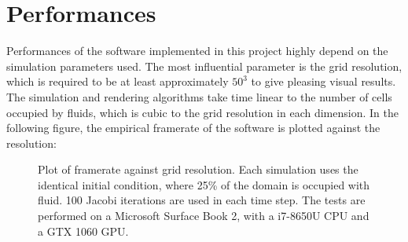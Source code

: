 \section{Performances}

Performances of the software implemented in this project highly depend on the simulation parameters used. The most influential parameter is the grid resolution, which is required to be at least approximately $50^3$ to give pleasing visual results. The simulation and rendering algorithms take time linear to the number of cells occupied by fluids, which is cubic to the grid resolution in each dimension. In the following figure, the empirical framerate of the software is plotted against the resolution:

\begin{figure}[H]
    \centering

    
    \caption{Plot of framerate against grid resolution. Each simulation uses the identical initial condition, where 25\% of the domain is occupied with fluid. 100 Jacobi iterations are used in each time step. The tests are performed on a Microsoft Surface Book 2, with a i7-8650U CPU and a GTX 1060 GPU.}
    \label{fig FPS vs grid res}
\end{figure}


